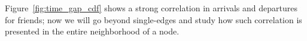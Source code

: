 \documentclass[phd,tocprelim]{cornell}
\renewcommand{\caption}[1]{\singlespacing\hangcaption{#1}\normalspacing}
\begin{document}

Figure~\ref{fig:time_gap_cdf} shows a strong correlation in arrivals and departures for friends; now we will go beyond single-edges and study how such correlation is presented in the entire neighborhood of a node.
\end{document}

